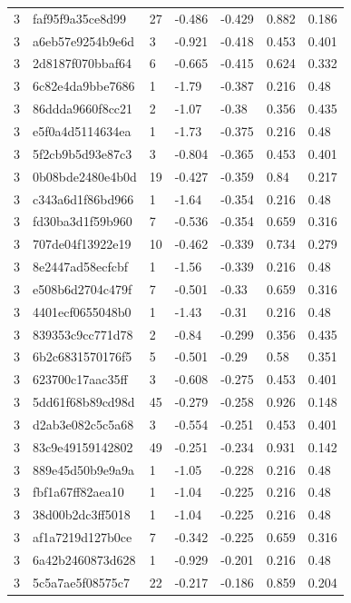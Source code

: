 \begin{tabular}{lllllll}
3 & faf95f9a35ce8d99 & 27 & -0.486 & -0.429 & 0.882 & 0.186 \\
3 & a6eb57e9254b9e6d & 3 & -0.921 & -0.418 & 0.453 & 0.401 \\
3 & 2d8187f070bbaf64 & 6 & -0.665 & -0.415 & 0.624 & 0.332 \\
3 & 6c82e4da9bbe7686 & 1 & -1.79 & -0.387 & 0.216 & 0.48 \\
3 & 86ddda9660f8cc21 & 2 & -1.07 & -0.38 & 0.356 & 0.435 \\
3 & e5f0a4d5114634ea & 1 & -1.73 & -0.375 & 0.216 & 0.48 \\
3 & 5f2cb9b5d93e87c3 & 3 & -0.804 & -0.365 & 0.453 & 0.401 \\
3 & 0b08bde2480e4b0d & 19 & -0.427 & -0.359 & 0.84 & 0.217 \\
3 & c343a6d1f86bd966 & 1 & -1.64 & -0.354 & 0.216 & 0.48 \\
3 & fd30ba3d1f59b960 & 7 & -0.536 & -0.354 & 0.659 & 0.316 \\
3 & 707de04f13922e19 & 10 & -0.462 & -0.339 & 0.734 & 0.279 \\
3 & 8e2447ad58ecfcbf & 1 & -1.56 & -0.339 & 0.216 & 0.48 \\
3 & e508b6d2704c479f & 7 & -0.501 & -0.33 & 0.659 & 0.316 \\
3 & 4401ecf0655048b0 & 1 & -1.43 & -0.31 & 0.216 & 0.48 \\
3 & 839353c9cc771d78 & 2 & -0.84 & -0.299 & 0.356 & 0.435 \\
3 & 6b2c6831570176f5 & 5 & -0.501 & -0.29 & 0.58 & 0.351 \\
3 & 623700c17aac35ff & 3 & -0.608 & -0.275 & 0.453 & 0.401 \\
3 & 5dd61f68b89cd98d & 45 & -0.279 & -0.258 & 0.926 & 0.148 \\
3 & d2ab3e082c5c5a68 & 3 & -0.554 & -0.251 & 0.453 & 0.401 \\
3 & 83c9e49159142802 & 49 & -0.251 & -0.234 & 0.931 & 0.142 \\
3 & 889e45d50b9e9a9a & 1 & -1.05 & -0.228 & 0.216 & 0.48 \\
3 & fbf1a67ff82aea10 & 1 & -1.04 & -0.225 & 0.216 & 0.48 \\
3 & 38d00b2dc3ff5018 & 1 & -1.04 & -0.225 & 0.216 & 0.48 \\
3 & af1a7219d127b0ce & 7 & -0.342 & -0.225 & 0.659 & 0.316 \\
3 & 6a42b2460873d628 & 1 & -0.929 & -0.201 & 0.216 & 0.48 \\
3 & 5c5a7ae5f08575c7 & 22 & -0.217 & -0.186 & 0.859 & 0.204 \\

\end{tabular}
